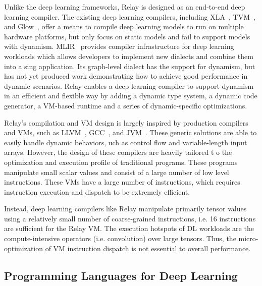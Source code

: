 Unlike the deep learning frameworks, Relay is designed as an end-to-end deep learning compiler.
The existing deep learning compilers, including XLA~\citep{xla}, TVM~\citep{tvm_osdi18}, and Glow~\citep{glow},
  offer a means to compile deep learning models to run on multiple hardware platforms,
  but only focus on static models and fail to support models with dynamism.
MLIR~\citep{lattner2020mlir} provides compiler infrastructure for deep learning workloads
  which allows developers to implement new dialects and combine them into a sing application.
Its graph-level dialect has the support for dynamism, but has not yet produced work demonstrating
  how to achieve good performance in dynamic scenarios.
Relay enables a deep learning compiler to support dynamism in an efficient and flexible way
  by adding a dynamic type system, a dynamic code generator, a VM-based runtime and a series of dynamic-specific optimizations.

Relay's compilation and VM design is largely inspired by production compilers and VMs,
such as LLVM~\citep{llvm}, GCC~\citep{gcc}, and JVM~\citep{jvm}.
These generic solutions are able to easily handle dynamic behaviors,
uch as control flow and variable-length input arrays.
However, the design of these compilers are heavily tailored t
o the optimization and execution profile of traditional programs.
These programs manipulate small scalar values and consist of a large
number of low level instructions. These VMs have a large number of instructions,
which requires instruction execution and dispatch to be extremely efficient.

Instead, deep learning compilers like Relay manipulate primarily
tensor values using a relatively small number of coarse-grained instructions,
 i.e. 16 instructions are sufficient for the Relay VM. The execution hotspots
 of DL workloads are the compute-intensive operators (i.e. convolution)
 over large tensors. Thus, the micro-optimization of VM instruction
  dispatch is not essential to overall performance.

\subsection{Programming Languages for Deep Learning}
\label{sec:pl_techniques_in_dl}

